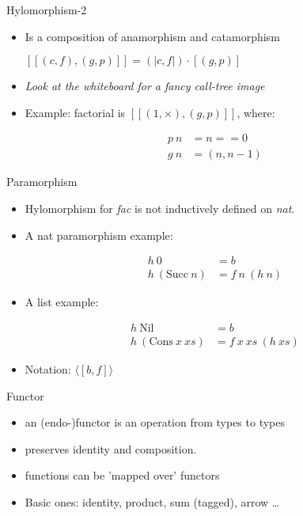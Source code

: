 \documentclass{beamer}
\begin{document}
\begin{frame}{Hylomorphism-2}
\begin{itemize}

\item Is a composition of anamorphism and catamorphism

$[\![(c,f), (g,p)]\!] = (\!|c, f|\!) \cdot [\!(g, p)\!]$

\item \textit{Look at the whiteboard for a fancy call-tree image}
\item Example: factorial is $[\![(1, \times), (g,p)]\!]$, where:

\begin{align*}
p\ n &= n == 0 \\
g\ n &= (n, n-1)
\end{align*}
\end{itemize}
\end{frame}


\begin{frame}[fragile]{Paramorphism}

\begin{itemize}
\item Hylomorphism for \textit{fac }is not inductively defined on \textit{nat}.
\item A nat paramorphism example:

\begin{align*}
h\ 0&= b\\
h\ (\text{Succ} \ n ) &= f\ n\ (h\ n)
\end{align*}

\item A list example:

\begin{align*}
h\ \text{Nil}& = b\\
h\ (\text{Cons}\ x\ xs ) &= f\ x\ xs\ (h\ xs)
\end{align*}

\item Notation: $\langle\![ b, f ]\!\rangle$
\end{itemize}

\end{frame}

\begin{frame}{Functor}
\begin{itemize}
\item an (endo-)functor is an operation from types to types
\item preserves identity and composition.
\item functions can be 'mapped over' functors
\item Basic ones: identity, product, sum (tagged), arrow \dots

\end{itemize}

\end{frame}
\end{document}
